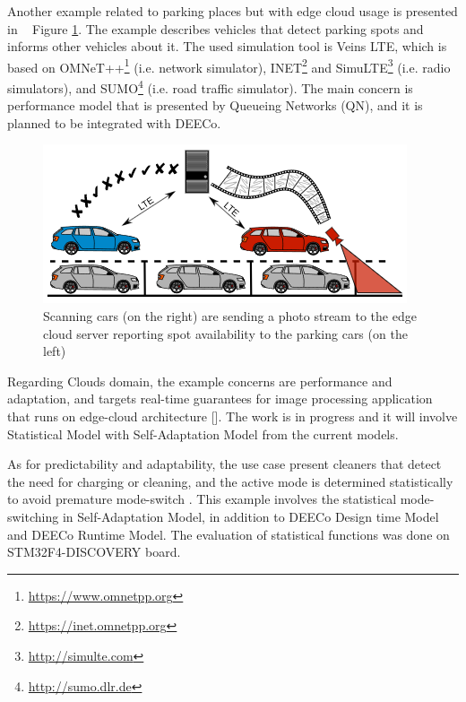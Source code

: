  Another example related to parking places but with edge cloud usage is presented in ~\cite{Bures:2018:PMS:3185768.3186306} Figure \ref{fig:parking}. The example describes vehicles that detect parking spots and informs other vehicles about it. The used simulation tool is Veins LTE, which is based on OMNeT++\footnote{\url{https://www.omnetpp.org}} (i.e. network simulator), INET\footnote{\url{https://inet.omnetpp.org}} and SimuLTE\footnote{\url{http://simulte.com}} (i.e. radio simulators), and SUMO\footnote{\url{http://sumo.dlr.de}} (i.e. road traffic simulator). The main concern is performance model that is presented by Queueing Networks (QN), and it is planned to be integrated with DEECo. 
 
\begin{figure}[!htb]
\centering
\includegraphics[scale=0.65]{figures/parking}
\caption{Scanning cars (on the right) are sending a photo stream to the edge cloud server reporting spot availability to the parking cars (on the left)}
\label{fig:parking}
\end{figure}
 
Regarding Clouds domain, the example concerns are performance and adaptation, and targets real-time guarantees for image processing application that runs on edge-cloud architecture [\cite{Hnetynka:2018:GLA:3241403.3241448}]. The work is in progress and it will involve Statistical Model with Self-Adaptation Model from the current models. 

As for predictability and adaptability, the use case present cleaners that detect the need for charging or cleaning, and the active mode is determined statistically to avoid premature mode-switch \cite{bures2016stat}. This example involves the statistical mode-switching in Self-Adaptation Model, in addition to DEECo Design time Model and DEECo Runtime Model. The evaluation of statistical functions was done on STM32F4-DISCOVERY board. 
 
